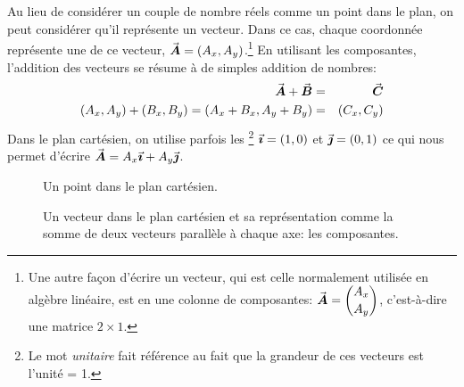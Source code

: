 Au lieu de considérer un couple de nombre réels comme un point dans le plan,
on peut considérer qu'il représente un vecteur.  Dans ce cas, chaque coordonnée
représente une  de ce vecteur, $\vec{\boldsymbol{\boldsymbol{A}}} = (A_x, A_y)$.\footnote{Une autre
façon d'écrire un vecteur, qui est celle normalement utilisée en algèbre linéaire, 
est en une colonne de composantes: $\vec{\boldsymbol{\boldsymbol{A}}} = \displaystyle \binom{ A_x}{A_y}$, c'est-à-dire une matrice
$2\times 1$.}
En utilisant les composantes, l'addition des vecteurs se résume à de simples
addition de nombres:
\begin{eqnarray*}
\vec{\boldsymbol{\boldsymbol{A}}} + \vec{\boldsymbol{\boldsymbol{B}}} &=& \vec{\boldsymbol{\boldsymbol{C}}} \\
(A_x, A_y) + (B_x, B_y) = (A_x + B_x, A_y + B_y) &=& (C_x, C_y)
\end{eqnarray*}
Dans le plan cartésien, on utilise parfois les \footnote{Le mot \textit{unitaire} fait référence au 
fait que la grandeur de ces vecteurs est l'unité = 1.} $\vec{\boldsymbol{\imath}} = (1, 0)$ et $\vec{\boldsymbol{\jmath}} = (0, 1)$ ce qui nous
permet d'écrire $\vec{\boldsymbol{\boldsymbol{A}}} = A_x \vec{\boldsymbol{\imath}} + A_y \vec{\boldsymbol{\jmath}}$.

\begin{figure}[h]
\begin{minipage}{0.45\textwidth}
\caption{Un point dans le plan cartésien.}
\end{minipage}\hfill
\begin{minipage}{0.45\textwidth}
\caption{Un vecteur dans le plan cartésien et sa représentation comme la somme de deux vecteurs
parallèle à chaque axe: les composantes.}
\end{minipage}
\end{figure}
